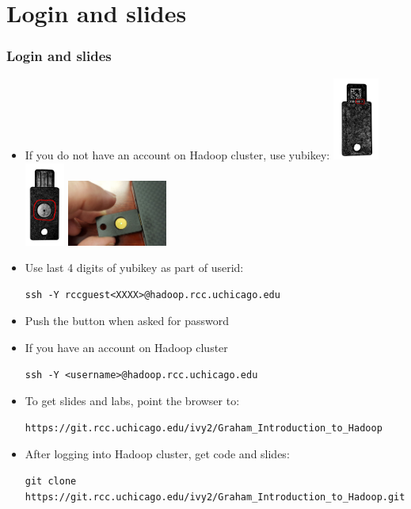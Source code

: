 \section{Login and slides}
\begin{frame}[fragile]
  \frametitle{Login and slides}

  \begin{itemize}
  \item If you do not have an account on Hadoop cluster, use yubikey:
    \includegraphics[width=1.5cm]{icons/yubikey1a.jpg}
    \includegraphics[width=1.3cm]{icons/yubikey2a.jpg}
    \includegraphics[width=3.3cm]{icons/yubikey3a.jpg}
  \item Use last 4 digits of yubikey as part of userid:
    {\color{mycolorcli}
\begin{verbatim}
ssh -Y rccguest<XXXX>@hadoop.rcc.uchicago.edu
\end{verbatim}
    }
  \item Push the button when asked for password
  \item If you have an account on Hadoop cluster
    {\color{mycolorcli}
\begin{verbatim}
ssh -Y <username>@hadoop.rcc.uchicago.edu
\end{verbatim}
    }
  \item To get slides and labs, point the browser to:
    {\tiny
      {\color{mycolorcli}
\begin{verbatim}
https://git.rcc.uchicago.edu/ivy2/Graham_Introduction_to_Hadoop
\end{verbatim}
      }
    }
  \item After logging into Hadoop cluster, get code and slides:
    {\tiny
      {\color{mycolorcli}
\begin{verbatim}
git clone https://git.rcc.uchicago.edu/ivy2/Graham_Introduction_to_Hadoop.git
\end{verbatim}
      }
    }
  \end{itemize}
\end{frame}

